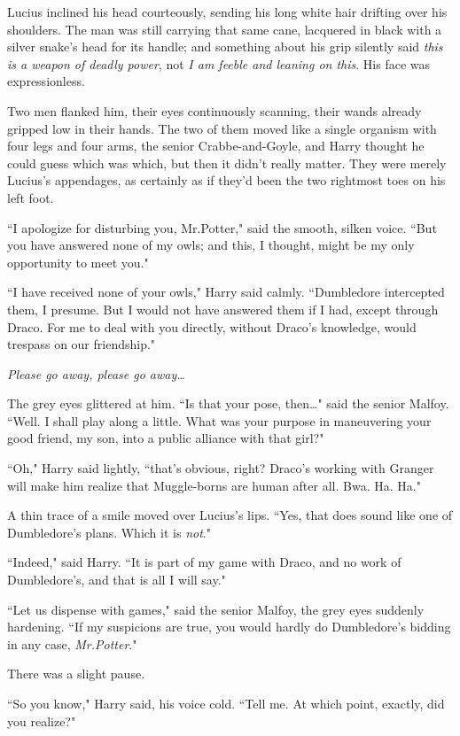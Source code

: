Lucius inclined his head courteously, sending his long white hair drifting over his shoulders. The man was still carrying that same cane, lacquered in black with a silver snake's head for its handle; and something about his grip silently said \emph{this is a weapon of deadly power}, not \emph{I am feeble and leaning on this}. His face was expressionless.

Two men flanked him, their eyes continuously scanning, their wands already gripped low in their hands. The two of them moved like a single organism with four legs and four arms, the senior Crabbe-and-Goyle, and Harry thought he could guess which was which, but then it didn't really matter. They were merely Lucius's appendages, as certainly as if they'd been the two rightmost toes on his left foot.

``I apologize for disturbing you, Mr.\?Potter," said the smooth, silken voice. ``But you have answered none of my owls; and this, I thought, might be my only opportunity to meet you."

``I have received none of your owls," Harry said calmly. ``Dumbledore intercepted them, I presume. But I would not have answered them if I had, except through Draco. For me to deal with you directly, without Draco's knowledge, would trespass on our friendship."

\emph{Please go away, please go away{\ldots}}

The grey eyes glittered at him. ``Is that your pose, then{\ldots}" said the senior Malfoy. ``Well. I shall play along a little. What was your purpose in maneuvering your good friend, my son, into a public alliance with that girl?"

``Oh," Harry said lightly, ``that's obvious, right? Draco's working with Granger will make him realize that Muggle-borns are human after all. Bwa. Ha. Ha."

A thin trace of a smile moved over Lucius's lips. ``Yes, that does sound like one of Dumbledore's plans. Which it is \emph{not}."

``Indeed," said Harry. ``It is part of my game with Draco, and no work of Dumbledore's, and that is all I will say."

``Let us dispense with games," said the senior Malfoy, the grey eyes suddenly hardening. ``If my suspicions are true, you would hardly do Dumbledore's bidding in any case, \emph{Mr.\?Potter}."

There was a slight pause.

``So you know," Harry said, his voice cold. ``Tell me. At which point, exactly, did you realize?"

